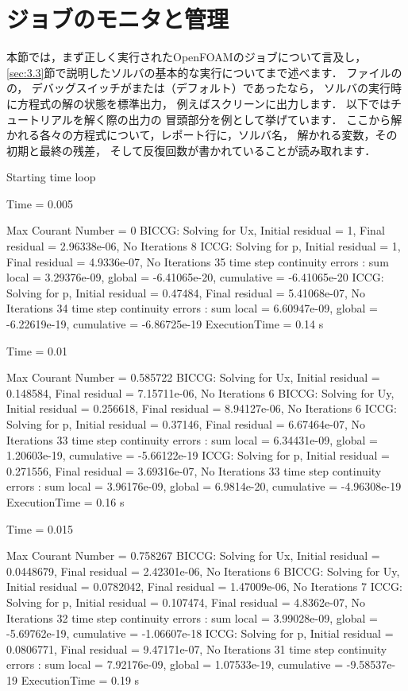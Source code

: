 \section{ジョブのモニタと管理}
\label{sec:6.6}
本節では，まず正しく実行されたOpenFOAMのジョブについて言及し，
\autoref{sec:3.3}節で説明したソルバの基本的な実行についてまで述べます．
ファイルの
の，
デバッグスイッチがまたは（デフォルト）であったなら，
ソルバの実行時に方程式の解の状態を標準出力，
例えばスクリーンに出力します．
以下ではチュートリアルを解く際の出力の
冒頭部分を例として挙げています．
ここから解かれる各々の方程式について，レポート行に，ソルバ名，
解かれる変数，その初期と最終の残差，
そして反復回数が書かれていることが読み取れます．
\begin{OFverbatim}[baselinestretch=1, leftskip=1em, weight=\scriptsize]
    Starting time loop

Time = 0.005

Max Courant Number = 0
BICCG: Solving for Ux, Initial residual = 1, Final residual = 2.96338e-06, No Iterations 8
ICCG: Solving for p, Initial residual = 1, Final residual = 4.9336e-07, No Iterations 35
time step continuity errors : sum local = 3.29376e-09, global = -6.41065e-20, cumulative = -6.41065e-20
ICCG: Solving for p, Initial residual = 0.47484, Final residual = 5.41068e-07, No Iterations 34
time step continuity errors : sum local = 6.60947e-09, global = -6.22619e-19, cumulative = -6.86725e-19
ExecutionTime = 0.14 s

Time = 0.01

Max Courant Number = 0.585722
BICCG: Solving for Ux, Initial residual = 0.148584, Final residual = 7.15711e-06, No Iterations 6
BICCG: Solving for Uy, Initial residual = 0.256618, Final residual = 8.94127e-06, No Iterations 6
ICCG: Solving for p, Initial residual = 0.37146, Final residual = 6.67464e-07, No Iterations 33
time step continuity errors : sum local = 6.34431e-09, global = 1.20603e-19, cumulative = -5.66122e-19
ICCG: Solving for p, Initial residual = 0.271556, Final residual = 3.69316e-07, No Iterations 33
time step continuity errors : sum local = 3.96176e-09, global = 6.9814e-20, cumulative = -4.96308e-19
ExecutionTime = 0.16 s

Time = 0.015

Max Courant Number = 0.758267
BICCG: Solving for Ux, Initial residual = 0.0448679, Final residual = 2.42301e-06, No Iterations 6
BICCG: Solving for Uy, Initial residual = 0.0782042, Final residual = 1.47009e-06, No Iterations 7
ICCG: Solving for p, Initial residual = 0.107474, Final residual = 4.8362e-07, No Iterations 32
time step continuity errors : sum local = 3.99028e-09, global = -5.69762e-19, cumulative = -1.06607e-18
ICCG: Solving for p, Initial residual = 0.0806771, Final residual = 9.47171e-07, No Iterations 31
time step continuity errors : sum local = 7.92176e-09, global = 1.07533e-19, cumulative = -9.58537e-19
ExecutionTime = 0.19 s
\end{OFverbatim}


